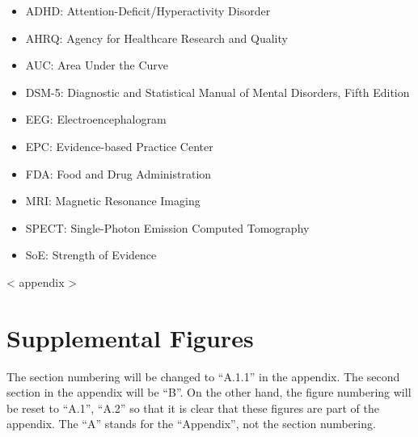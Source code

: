 \documentclass[
  12pt,
  letterpaper,
]{article}
\providecommand{\tightlist}{%
  \setlength{\itemsep}{0pt}\setlength{\parskip}{0pt}}
\renewcommand{\[}{\begin{singlespace}\oldDisplayMath}
\renewcommand{\]}{\endoldDisplayMath\end{singlespace}\vspace{\baselineskip}}
\begin{document}
\begin{itemize}
\tightlist
\item
  ADHD: Attention-Deficit/Hyperactivity Disorder
\item
  AHRQ: Agency for Healthcare Research and Quality
\item
  AUC: Area Under the Curve
\item
  DSM-5: Diagnostic and Statistical Manual of Mental Disorders, Fifth
  Edition
\item
  EEG: Electroencephalogram
\item
  EPC: Evidence-based Practice Center
\item
  FDA: Food and Drug Administration
\item
  MRI: Magnetic Resonance Imaging
\item
  SPECT: Single-Photon Emission Computed Tomography
\item
  SoE: Strength of Evidence
\end{itemize}

{{< appendix >}}

\section{Supplemental Figures}\label{supplemental-figures}

The section numbering will be changed to ``A.1.1'' in the appendix. The
second section in the appendix will be ``B''. On the other hand, the
figure numbering will be reset to ``A.1'', ``A.2'' so that it is clear
that these figures are part of the appendix. The ``A'' stands for the
``Appendix'', not the section numbering.

\newpage{}
\end{document}
